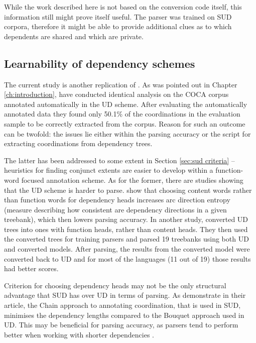 While the work described here is not based on the conversion code itself, this information still might prove itself useful. The parser was trained on SUD corpora, therefore it might be able to provide additional clues as to which dependents are shared and which are private. 

\subsection{Learnability of dependency schemes}\label{sec:learnability}
The current study is another replication of \cite{prz:woz:23}. As was pointed out in Chapter \ref{ch:introduction}, \cite{pbg2023} have conducted identical analysis on the COCA corpus annotated automatically in the UD scheme. After evaluating the automatically annotated data they found only 50.1\% of the coordinations in the evaluation sample to be correctly extracted from the corpus. Reason for such an outcome can be twofold: the issues lie either within the parsing accuracy or the script for extracting coordinations from dependency trees. 

The latter has been addressed to some extent in Section \ref{sec:sud criteria} -- heuristics for finding conjunct extents are easier to develop within a function-word focused annotation scheme. As for the former, there are studies showing that the UD scheme is harder to parse. \cite{rehbein-etal-2017-universal} show that choosing content words rather than function words for dependency heads increases arc direction entropy (measure describing how consistent are dependency directions in a given treebank), which then lowers parsing accuracy. In another study, \cite{kohita-etal-2017-multilingual} converted UD trees into ones with function heads, rather than content heads. They then used the converted trees for training parsers and parsed 19 treebanks using both UD and converted models. After parsing, the results from the converted model were converted back to UD and for most of the languages (11 out of 19) those results had better scores. 

Criterion for choosing dependency heads may not be the only structural advantage that SUD has over UD in terms of parsing. As \cite{gerdes-etal-2018-sud} demonstrate in their article, the Chain approach to annotating coordination, that is used in SUD, minimises the dependency lengths compared to the Bouquet approach used in UD. This may be beneficial for parsing accuracy, as parsers tend to perform better when working with shorter dependencies \citep{nilsson-etal-2006-graph, eisner-smith-2005-parsing}. 

